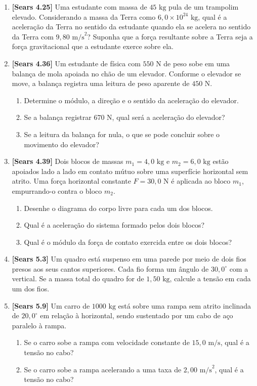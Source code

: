 \documentclass[11pt,a4paper]{article}
\begin{document}
\begin{enumerate}[label=\textbf{\arabic*.}, leftmargin=*, itemsep=0.45cm, resume]
\item \textbf{[Sears 4.25]} Uma estudante com massa de $45\text{ kg}$ pula de um trampolim elevado. Considerando a massa da Terra como $6,0 \times 10^{24}\text{ kg}$, qual é a aceleração da Terra no sentido da estudante quando ela se acelera no sentido da Terra com $9,80\text{ m/s}^2$? Suponha que a força resultante sobre a Terra seja a força gravitacional que a estudante exerce sobre ela.

\item \textbf{[Sears 4.36]} Um estudante de física com $550\text{ N}$ de peso sobe em uma balança de mola apoiada no chão de um elevador. Conforme o elevador se move, a balança registra uma leitura de peso aparente de $450\text{ N}$.
\begin{enumerate}[label=\alph*)]
    \item Determine o módulo, a direção e o sentido da aceleração do elevador.
    \item Se a balança registrar $670\text{ N}$, qual será a aceleração do elevador?
    \item Se a leitura da balança for nula, o que se pode concluir sobre o movimento do elevador?
\end{enumerate}

\item \textbf{[Sears 4.39]} Dois blocos de massas $m_1 = 4,0\text{ kg}$ e $m_2 = 6,0\text{ kg}$ estão apoiados lado a lado em contato mútuo sobre uma superfície horizontal sem atrito. Uma força horizontal constante $F = 30,0\text{ N}$ é aplicada ao bloco $m_1$, empurrando-o contra o bloco $m_2$.
\begin{enumerate}[label=\alph*)]
    \item Desenhe o diagrama do corpo livre para cada um dos blocos.
    \item Qual é a aceleração do sistema formado pelos dois blocos?
    \item Qual é o módulo da força de contato exercida entre os dois blocos?
\end{enumerate}

\item \textbf{[Sears 5.3]} Um quadro está suspenso em uma parede por meio de dois fios presos aos seus cantos superiores. Cada fio forma um ângulo de $30,0^\circ$ com a vertical. Se a massa total do quadro for de $1,50\text{ kg}$, calcule a tensão em cada um dos fios.

\item \textbf{[Sears 5.9]} Um carro de $1000\text{ kg}$ está sobre uma rampa sem atrito inclinada de $20,0^\circ$ em relação à horizontal, sendo sustentado por um cabo de aço paralelo à rampa.
\begin{enumerate}[label=\alph*)]
    \item Se o carro sobe a rampa com velocidade constante de $15,0\text{ m/s}$, qual é a tensão no cabo?
    \item Se o carro sobe a rampa acelerando a uma taxa de $2,00\text{ m/s}^2$, qual é a tensão no cabo?
\end{enumerate}


\end{enumerate}
\end{document}
